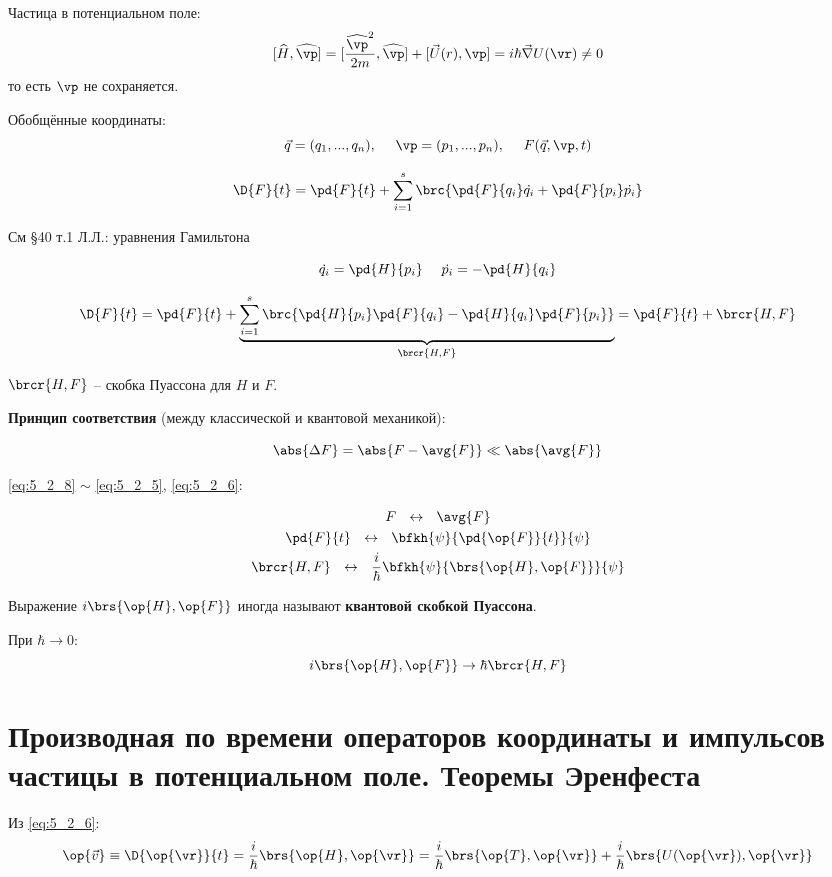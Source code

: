 Частица в потенциальном поле:
\begin{equation}
\label{eq:5_2_7}
[\widehat{H}, \widehat{\vp}] = [\frac{\widehat{\vp}^2}{2m}, \widehat{\vp}] + [\vec{U}(r), \vp] = i \hbar \vec{\nabla} U(\vr) \ne 0
\end{equation}
то есть $\vp$ не сохраняется.

Обобщённые координаты:
$$
\vec{q} = (q_1, ..., q_n),~~~~ \vp = (p_1, ..., p_n), ~~~~ F(\vec{q}, \vp, t)
$$

$$
\D{F}{t} = \pd{F}{t} + \sum_{i=1}^{s}\brc{\pd{F}{q_i} \dot{q_i} + \pd{F}{p_i} \dot{p_i} }
$$

См \S 40 т.1 Л.Л.: уравнения Гамильтона

$$
\dot{q_i} = \pd{H}{p_i} ~~~~ \dot{p_i} = -\pd{H}{q_i}
$$

\begin{equation}
\label{eq:5_2_8}
\D{F}{t}= \pd{F}{t} + \underbrace{ \sum_{i=1}^{s} \brc{ \pd{H}{p_i} \pd{F}{q_i} - \pd{H}{q_i} \pd{F}{p_i} } }_{\brcr{H, F}} = \pd{F}{t} + \brcr{H, F}
\end{equation}

$\brcr{H, F}$ -- скобка Пуассона для $H$ и $F$.

\textbf{Принцип соответствия} (между классической и квантовой механикой):

$$
\abs{\Delta F} = \abs{F - \avg{F}} \ll \abs{\avg{F}}
$$

\eqref{eq:5_2_8} $\sim$ \eqref{eq:5_2_5}, \eqref{eq:5_2_6}:

$$
\begin{gathered}
F ~~\leftrightarrow~~ \avg{F} \\
\pd{F}{t} ~~\leftrightarrow~~ \bfkh{\psi}{\pd{\op{F}}{t}}{\psi} \\
\brcr{H, F} ~~\leftrightarrow~~ \frac{i}{\hbar} \bfkh{\psi}{ \brs{\op{H}, \op{F}} }{\psi}
\end{gathered}
$$

Выражение $i \brs{\op{H}, \op{F}}$ иногда называют \textbf{квантовой скобкой Пуассона}.

При $\hbar \to 0$:
$$
i \brs{\op{H}, \op{F}} \to \hbar \brcr{H, F}
$$


\section{Производная по времени операторов координаты и импульсов частицы в потенциальном поле. Теоремы Эренфеста}

Из \eqref{eq:5_2_6}:
$$
\op{\vec{v}} \equiv \D{\op{\vr}}{t} = \frac{i}{\hbar} \brs{\op{H}, \op{\vr}} = \frac{i}{\hbar} \brs{\op{T}, \op{\vr}} + \frac{i}{\hbar} \brs{U(\op{\vr}), \op{\vr}}
$$

